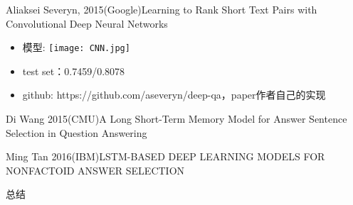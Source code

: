 \documentclass{beamer}
\begin{document}
\begin{frame}{Aliaksei Severyn, 2015(Google)}{Learning to Rank Short Text Pairs with Convolutional Deep Neural Networks}
\begin{itemize}
\item 模型:
\texttt{[image: CNN.jpg]}
\item test set：0.7459/0.8078
\item github: https://github.com/aseveryn/deep-qa，paper作者自己的实现
\end{itemize}
\end{frame}
\begin{frame}{Di Wang 2015(CMU)}{A Long Short-Term Memory Model for Answer Sentence Selection in Question Answering}
\end{frame}
\begin{frame}{Ming Tan 2016(IBM)}{LSTM-BASED DEEP LEARNING MODELS FOR NONFACTOID ANSWER SELECTION}
\end{frame}
\begin{frame}{总结}
\end{frame}
\end{document}
